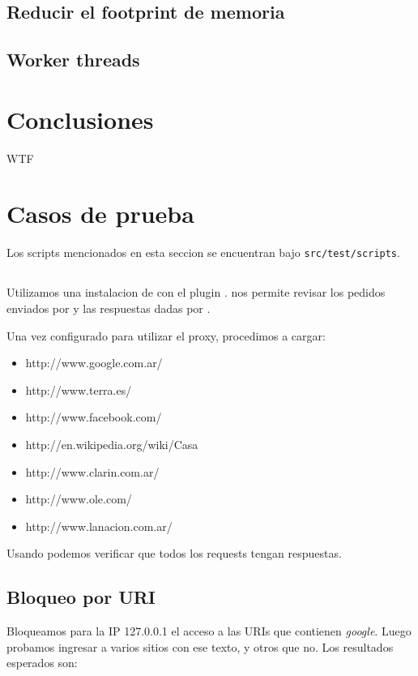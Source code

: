 \documentclass[11pt,a4paper,titlepage]{article}
\begin{document}
    \subsection{Reducir el footprint de memoria}

    \subsection{Worker threads}

\section{Conclusiones}
    WTF

\section{Casos de prueba}

    Los scripts mencionados en esta seccion se encuentran bajo \texttt{src/test/scripts}.

    \subsection{}
    Utilizamos una instalacion de  con el plugin .
     nos permite revisar los pedidos enviados por  y las respuestas dadas por \duta.

    Una vez configurado  para utilizar el proxy, procedimos a cargar:
    \begin{itemize}
        \item http://www.google.com.ar/
        \item http://www.terra.es/
        \item http://www.facebook.com/
        \item http://en.wikipedia.org/wiki/Casa
        \item http://www.clarin.com.ar/
        \item http://www.ole.com/
        \item http://www.lanacion.com.ar/
    \end{itemize}

    Usando  podemos verificar que todos los requests tengan respuestas.

    \subsection{Bloqueo por URI}
    Bloqueamos para la IP 127.0.0.1 el acceso a las URIs que contienen \textit{google}.
    Luego probamos ingresar a varios sitios con ese texto, y otros que no.
    Los resultados esperados son:
\end{document}
